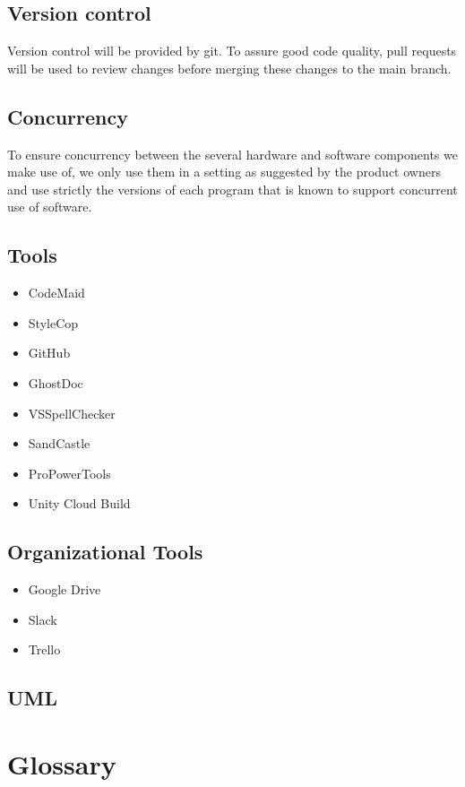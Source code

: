 \documentclass[11pt,a4paper]{report}
\begin{document}
\section{Version control}
Version control will be provided by git. To assure good code quality, pull requests will be
used to review changes before merging these changes to the main branch.
\section{Concurrency}
To ensure concurrency between the several hardware and software components we make use
of, we only use them in a setting as suggested by the product owners and use 
strictly the
versions of each program that is known to support concurrent use of software.
\section{Tools}
\begin{itemize}
\item CodeMaid
\item StyleCop
\item GitHub
\item GhostDoc
\item VSSpellChecker
\item SandCastle
\item ProPowerTools
\item Unity Cloud Build
\end{itemize}
\section{Organizational Tools}
\begin{itemize}
\item Google Drive
\item Slack
\item Trello
\end{itemize}

\section{UML}









\chapter{Glossary}
\end{document}
